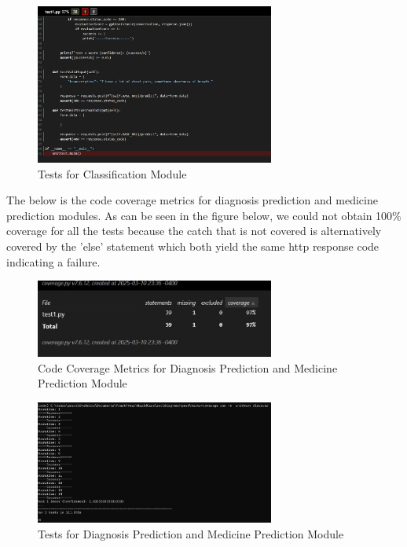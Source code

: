 \documentclass[12pt, titlepage]{article}
\begin{document}
\begin{figure}[h]
  \centering
  \includegraphics[width=0.7\textwidth]{CCMmissing.jpg}
  \caption{Tests for Classification Module}
  \label{FigUH}
\end{figure}

\clearpage

The below is the code coverage metrics for diagnosis prediction and medicine prediction modules. As can be seen in the figure below, we could not obtain 100\% coverage for all the tests because the catch that is not covered is alternatively covered by the 'else' statement which both yield the same http response code indicating a failure.

\begin{figure}[h]
  \centering
  \includegraphics[width=0.7\textwidth]{CCMforDiagMedPred.jpg}
  \caption{Code Coverage Metrics for Diagnosis Prediction and Medicine Prediction Module}
  \label{FigUH}
\end{figure}

\begin{figure}[h]
  \centering
  \includegraphics[width=0.7\textwidth]{DiagMedPrediction.jpg}
  \caption{Tests for Diagnosis Prediction and Medicine Prediction Module}
  \label{FigUH}
\end{figure}
\end{document}
